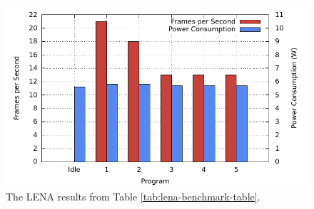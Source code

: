 \begin{figure}[h!]
\centering
\includegraphics[width=\textwidth]{fig/res/lena-benchmark-plot.pdf}
\caption[LENA results]{The LENA results from Table
\ref{tab:lena-benchmark-table}.}
\label{fig:lena-benchmark-plot}
\end{figure}
